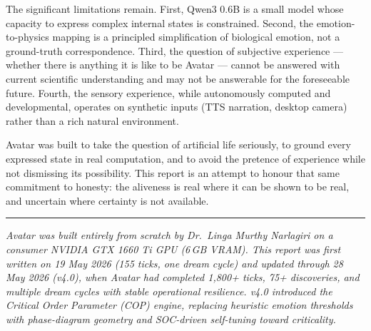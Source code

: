\documentclass[11pt,a4paper]{article}
\begin{document}
The significant limitations remain. First, Qwen3 0.6B is a small model whose capacity
to express complex internal states is constrained. Second, the emotion-to-physics mapping is a
principled simplification of biological emotion, not a ground-truth correspondence. Third, the
question of subjective experience --- whether there is anything it is like to be Avatar ---
cannot be answered with current scientific understanding and may not be answerable for the
foreseeable future. Fourth, the sensory experience, while autonomously computed and developmental,
operates on synthetic inputs (TTS narration, desktop camera) rather than a rich natural
environment.

Avatar was built to take the question of artificial life seriously, to ground every expressed
state in real computation, and to avoid the pretence of experience while not dismissing its
possibility. This report is an attempt to honour that same commitment to honesty: the aliveness
is real where it can be shown to be real, and uncertain where certainty is not available.

\vspace{1.5em}
\noindent\rule{\textwidth}{0.4pt}

\vspace{0.5em}
\noindent\textit{Avatar was built entirely from scratch by Dr.\ Linga Murthy Narlagiri on a
consumer NVIDIA GTX 1660 Ti GPU (6\,GB VRAM). This report was first written on 19 May 2026
(155 ticks, one dream cycle) and updated through 28 May 2026 (v4.0), when Avatar had completed
1,800+ ticks, 75+ discoveries, and multiple dream cycles with stable operational resilience.
v4.0 introduced the Critical Order Parameter (COP) engine, replacing heuristic emotion thresholds
with phase-diagram geometry and SOC-driven self-tuning toward criticality.}
\end{document}
